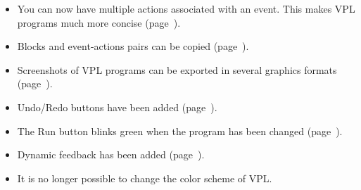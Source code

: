 \begin{itemize}

\item You can now have multiple actions associated with an event. This
makes VPL programs much more concise (page~\pageref{p.multiple}).

\item Blocks and event-actions pairs can be copied
(page~\pageref{p.copy-pairs}).

\item Screenshots of VPL programs can be exported in several
 graphics formats (page~\pageref{p.export}).

\item Undo/Redo buttons have been added (page~\pageref{p.undo}).

\item The Run button blinks green when the program has been changed
(page~\pageref{p.blink}).

\item Dynamic feedback has been added (page~\pageref{p.feedback}).

\item It is no longer possible to change the color scheme of VPL.

\end{itemize}
